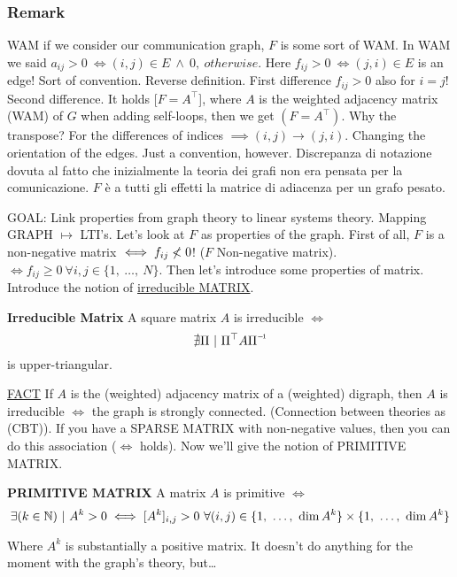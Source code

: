\subsubsection{Remark}

WAM if we consider our communication graph, $F$ is some sort of WAM. In WAM we said $a_{ij}>0\ \iff (i,j)\in E\ \land\ 0,\ otherwise$. Here $f_{ij}>0\ \iff (j,i)\in E$ is an edge! Sort of convention. Reverse definition. First difference $f_{ij}>0$ also for $i=j$! Second difference. It holds [$F=A^\top$], where $A$ is the weighted adjacency matrix (WAM) of $G$ when adding self-loops, then we get $(F=A^\top)$. Why the transpose? For the differences of indices $\implies (i,j)\rightarrow(j,i)$. Changing the orientation of the edges. Just a convention, however. Discrepanza di notazione dovuta al fatto che inizialmente la teoria dei grafi non era pensata per la comunicazione. $F$ è a tutti gli effetti la matrice di adiacenza per un grafo pesato.

GOAL: Link properties from graph theory to linear systems theory. Mapping GRAPH $\mapsto$ LTI's. Let's look at $F$ as properties of the graph. First of all, $F$ is a non-negative matrix $\iff f_{ij} \centernot{<} 0$! ($F$ Non-negative matrix). $\iff f_{ij} \geq 0\ \forall i,j \in \{1,\ \dots,\ N\}$. Then let's introduce some properties of matrix. Introduce the notion of \underline{irreducible MATRIX}.

\begin{defn}{\textbf{Irreducible Matrix}} \newline
A square matrix $A$ is irreducible $\iff$
\[
	\nexists \Pi\ |\ \inv{\Pi^\top A\Pi}
\]
is upper-triangular.
\end{defn}

\underline{FACT} If $A$ is the (weighted) adjacency matrix of a (weighted) digraph, then $A$ is irreducible $\iff$ the graph is strongly connected. (Connection between theories as (CBT)). If you have a SPARSE MATRIX with non-negative values, then you can do this association ($\iff$ holds). Now we'll give the notion of PRIMITIVE MATRIX.

\begin{defn}{\textbf{PRIMITIVE MATRIX}} \newline
A matrix $A$ is primitive $\iff$
\[
	\exists (k\in \mathbb{N})\ |\ A^k > 0 \iff [A^k]_{i,j} > 0\ \forall (i,j)\in \{1,\ \dots,\ \dim{A^k}\} \times \{1,\ \dots,\ \dim{A^k}\}
\]
\end{defn}

Where $A^k$ is substantially a positive matrix. It doesn't do anything for the moment with the graph's theory, but\dots

